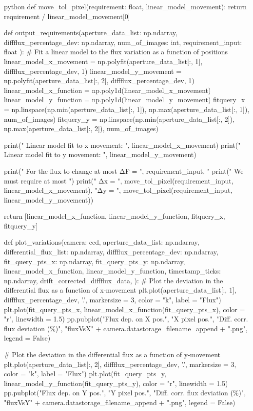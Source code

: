 \documentclass[../main.tex]{subfiles}
\begin{document}
\begin{mintedbox}{python}
def move_tol_pixel(requirement: float, linear_model_movement):
return requirement / linear_model_movement[0]


def output_requirements(aperture_data_list: np.ndarray,
diffflux_percentage_dev: np.ndarray,
num_of_images: int,
requirement_input: float
):
# Fit a linear model to the flux variation as a function of positions
linear_model_x_movement  =  np.polyfit(aperture_data_list[:, 1], diffflux_percentage_dev, 1)
linear_model_y_movement  =  np.polyfit(aperture_data_list[:, 2], diffflux_percentage_dev, 1)
linear_model_x_function  =  np.poly1d(linear_model_x_movement)
linear_model_y_function  =  np.poly1d(linear_model_y_movement)
fitquery_x  =  np.linspace(np.min(aperture_data_list[:, 1]), np.max(aperture_data_list[:, 1]), num_of_images)
fitquery_y  =  np.linspace(np.min(aperture_data_list[:, 2]), np.max(aperture_data_list[:, 2]), num_of_images)

print(" Linear model fit to x movement: \n ", linear_model_x_movement)
print(" Linear model fit to y movement: \n ", linear_model_y_movement)

print(" For the flux to change at most ΔF  =  ", requirement_input, "%
print(" We must require at most ")
print("  Δx  =  ", move_tol_pixel(requirement_input, linear_model_x_movement), "\n  Δy  =  ",
move_tol_pixel(requirement_input, linear_model_y_movement))

return [linear_model_x_function, linear_model_y_function, fitquery_x, fitquery_y]


def plot_variations(camera: ccd,
aperture_data_list: np.ndarray,
differential_flux_list: np.ndarray,
diffflux_percentage_dev: np.ndarray,
fit_query_pts_x: np.ndarray,
fit_query_pts_y: np.ndarray,
linear_model_x_function,
linear_model_y_function,
timestamp_ticks: np.ndarray,
drift_corrected_diffflux_data,
):
# Plot the deviation in the differential flux as a function of x-movement
plt.plot(aperture_data_list[:, 1], diffflux_percentage_dev, '.', markersize  =  3, color  =  "k", label  =  "Flux")
plt.plot(fit_query_pts_x, linear_model_x_function(fit_query_pts_x), color  =  "r", linewidth  =  1.5)
pp.pubplot("Flux dep. on X pos.", "X pixel pos.", "Diff. corr. flux deviation (\%)",
"fluxVsX" + camera.datastorage_filename_append + ".png", legend  =  False)

# Plot the deviation in the differential flux as a function of y-movement
plt.plot(aperture_data_list[:, 2], diffflux_percentage_dev, '.', markersize  =  3, color  =  "k", label  =  "Flux")
plt.plot(fit_query_pts_y, linear_model_y_function(fit_query_pts_y), color  =  "r", linewidth  =  1.5)
pp.pubplot("Flux dep. on Y pos.", "Y pixel pos.", "Diff. corr. flux deviation (\%)",
"fluxVsY" + camera.datastorage_filename_append + ".png", legend  =  False)


\end{mintedbox}
\end{document}
